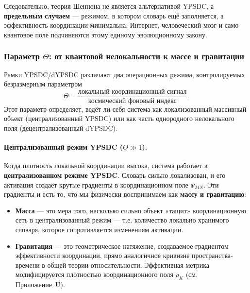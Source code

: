 \documentclass[12pt,a4paper]{article}
\theoremstyle{remark}
\begin{document}
	Следовательно, теория Шеннона не является альтернативой YPSDC, а \textbf{предельным случаем} — режимом, в котором словарь ещё заполняется, а эффективность координации минимальна. Интернет, человеческий мозг и само квантовое поле подчиняются этому единому эволюционному закону.
	
	\medskip
	
	\subsubsection{Параметр \(\Theta\): от квантовой нелокальности к массе и гравитации}
	\label{subsec:theta-mass-gravity}
	
	Рамки YPSDC/dYPSDC различают два операционных режима, контролируемых безразмерным параметром
	\begin{equation}
		\Theta = \frac{\text{локальный координационный сигнал}}{\text{космический фоновый индекс}}.
	\end{equation}
	Этот параметр определяет, ведёт ли себя система как локализованный массивный объект (централизованный YPSDC) или как часть однородного нелокального поля (децентрализованный dYPSDC).
	
	\paragraph{Централизованный режим YPSDC (\(\Theta \gg 1\)).}
	Когда плотность локальной координации высока, система работает в \textbf{централизованном режиме YPSDC}. Словарь сильно локализован, и его активация создаёт крутые градиенты в координационном поле \(\Psi_{MN}\). Эти градиенты и есть то, что мы физически воспринимаем как \textbf{массу и гравитацию}:
	
	\begin{itemize}
		\item \textbf{Масса} — это мера того, насколько сильно объект «тащит» координационную сеть в централизованный режим — т.е. количество локально хранимого словаря, которое сопротивляется изменениям активации.
		\item \textbf{Гравитация} — это геометрическое натяжение, создаваемое градиентом эффективности координации, прямо аналогичное кривизне пространства-времени в общей теории относительности. Эффективная метрика модифицируется плотностью координационного поля \(\rho_K\) (см. Приложение~U).
	\end{itemize}
	
\end{document}
